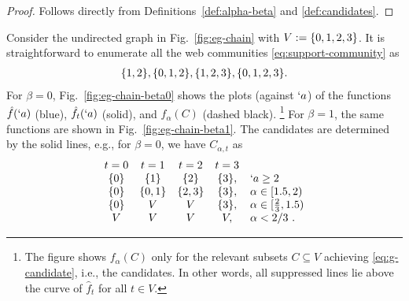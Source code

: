 \begin{proof}
	Follows directly from Definitions~\ref{def:alpha-beta} and \ref{def:candidates}.
\end{proof}

\begin{example}
	\label{eg:chain-community}
	Consider the undirected graph in Fig.~\ref{fig:eg-chain} with $V:=\{0,1,2,3\}$.
%
	It is straightforward to enumerate all the web communities \eqref{eq:support-community} as
	\begin{align}
		\label{eq:chain-communities}
		\Set{1,2},
		\Set{0,1,2},
		\Set{1,2,3}, %
		\Set{0,1,2,3}.
	\end{align}
%
	For $\beta = 0$, Fig.~\ref{fig:eg-chain-beta0}
	shows the plots (against $`a$) of the functions $\hat{f}(`a)$ (blue), $\hat{f}_{t}(`a)$
	(solid), and
	$f_{\alpha}(C)$ (dashed black).%
	\footnote{
	The figure shows $f_{\alpha}(C)$ only for the relevant
	subsets $C\subseteq V$ achieving \eqref{eq:g-candidate}, i.e., the candidates. In
	other words, all suppressed lines lie above the curve of $\hat{f}_{t}$ for all $t\in V$.
	}
	For $\beta = 1$, the same functions are shown in Fig.~\ref{fig:eg-chain-beta1}.
	The candidates are determined by the solid lines,
	e.g., for $\beta = 0$, we have $C_{\alpha,t}$ as
	\begin{align}
		\label{eq:eg-chain-candidates}
		\begin{array}{ccccl}
			 t=0 & t=1 & t=2 & t=3 &
			\\
			 \{0\} & \{1\} & \{2\} & \{3\}, & `a \geq  2 \\
			 \{0\} & \{0,1\} & \{2,3\} & \{3\}, &  \alpha \in  [1.5,2) \\
			 \{0\} & V & V & \{3\}, &  \alpha \in  [\frac{2}{3},1.5) \\
			 V & V & V & V, &  \alpha < 2/3 \ . \\
		\end{array}
	\end{align}

\end{example}

